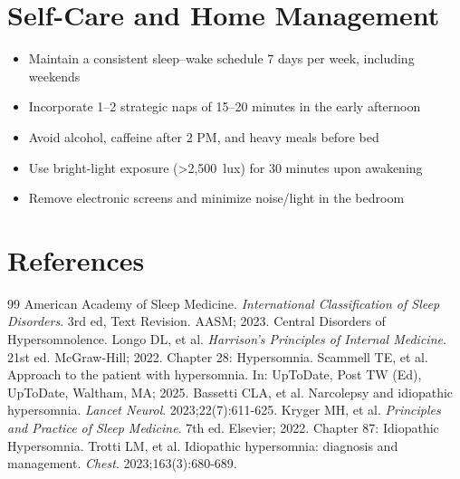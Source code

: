 \section*{Self-Care and Home Management}
\begin{itemize}
  \item Maintain a consistent sleep--wake schedule 7 days per week, including weekends
  \item Incorporate 1--2 strategic naps of 15--20 minutes in the early afternoon
  \item Avoid alcohol, caffeine after 2 PM, and heavy meals before bed
  \item Use bright-light exposure (\textgreater{}2,500~lux) for 30 minutes upon awakening
  \item Remove electronic screens and minimize noise/light in the bedroom
\end{itemize}

\section*{References}

\begin{thebibliography}{99}
 American Academy of Sleep Medicine. \emph{International Classification of Sleep Disorders}. 3rd ed, Text Revision. AASM; 2023. Central Disorders of Hypersomnolence.
 Longo DL, et al. \emph{Harrison's Principles of Internal Medicine}. 21st ed. McGraw-Hill; 2022. Chapter 28: Hypersomnia.
 Scammell TE, et al. Approach to the patient with hypersomnia. In: UpToDate, Post TW (Ed), UpToDate, Waltham, MA; 2025.
 Bassetti CLA, et al. Narcolepsy and idiopathic hypersomnia. \emph{Lancet Neurol}. 2023;22(7):611-625.
 Kryger MH, et al. \emph{Principles and Practice of Sleep Medicine}. 7th ed. Elsevier; 2022. Chapter 87: Idiopathic Hypersomnia.
 Trotti LM, et al. Idiopathic hypersomnia: diagnosis and management. \emph{Chest}. 2023;163(3):680-689.
\end{thebibliography}
